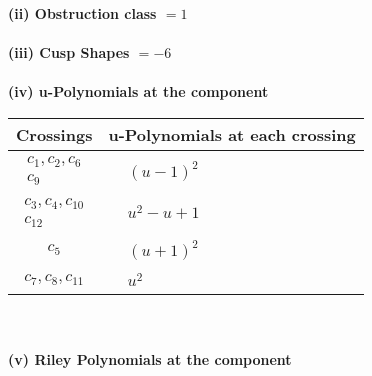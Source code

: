 \documentclass[1p]{elsarticle_modified}
\theoremstyle{definition}
\begin{document}
\flushleft \textbf{(ii) Obstruction class $= 1$}\\~\\
\flushleft \textbf{(iii) Cusp Shapes $= -6$}\\~\\
\newpage\renewcommand{\arraystretch}{1}
\flushleft \textbf{(iv) u-Polynomials at the component}\newline \\
\begin{tabular}{m{50pt}|m{274pt}}
Crossings & \hspace{64pt}u-Polynomials at each crossing \\
\hline $$\begin{aligned}c_{1},c_{2},c_{6}\\c_{9}\end{aligned}$$&$\begin{aligned}
&(u-1)^2
\end{aligned}$\\
\hline $$\begin{aligned}c_{3},c_{4},c_{10}\\c_{12}\end{aligned}$$&$\begin{aligned}
&u^2- u+1
\end{aligned}$\\
\hline $$\begin{aligned}c_{5}\end{aligned}$$&$\begin{aligned}
&(u+1)^2
\end{aligned}$\\
\hline $$\begin{aligned}c_{7},c_{8},c_{11}\end{aligned}$$&$\begin{aligned}
&u^2
\end{aligned}$\\
\hline
\end{tabular}\\~\\
\newpage\renewcommand{\arraystretch}{1}
\flushleft \textbf{(v) Riley Polynomials at the component}\newline \\
\end{document}
